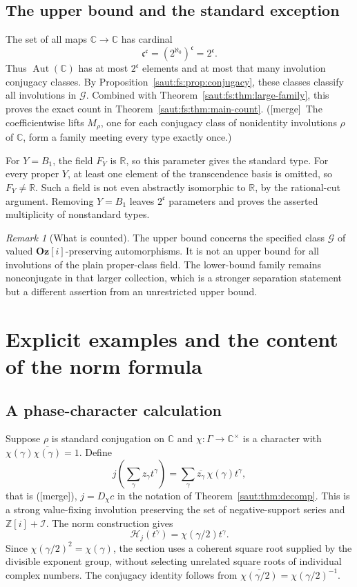 \documentclass[11pt]{article}
\theoremstyle{definition}
\theoremstyle{remark}
\newtheorem{remark}[theorem]{Remark}
\newcommand{\R}{\mathbb R}
\newcommand{\C}{\mathbb C}
\newcommand{\Z}{\mathbb Z}
\newcommand{\Aut}{\operatorname{Aut}}
\newcommand{\Oz}{\mathbf{Oz}}
\newcommand{\cc}{\mathfrak c}
\newcommand{\Ineg}{\mathcal I}
\newcommand{\mergetag}{\textup{[merge]}}
\numberwithin{equation}{section}
\begin{document}
\subsection{The upper bound and the standard exception}

The set of all maps $\C\to\C$ has cardinal
\[
 \cc^{\cc}=(2^{\aleph_0})^{\cc}=2^{\cc}.
\]
Thus $\Aut(\C)$ has at most $2^{\cc}$ elements and at most that many involution
conjugacy classes. By Proposition~\ref{saut:fs:prop:conjugacy}, these classes classify
all involutions in $\mathcal G$. Combined with Theorem~\ref{saut:fs:thm:large-family},
this proves the exact count in Theorem~\ref{saut:fs:thm:main-count}. (\mergetag\ The
coefficientwise lifts $M_\rho$, one for each conjugacy class of nonidentity
involutions $\rho$ of $\C$, form a family meeting every type exactly once.)

For $Y=B_1$, the field $F_Y$ is $\R$, so this parameter gives the standard type. For
every proper $Y$, at least one element of the transcendence basis is omitted, so
$F_Y\ne\R$. Such a field is not even abstractly isomorphic to $\R$, by the
rational-cut argument. Removing $Y=B_1$ leaves $2^{\cc}$ parameters and proves the
asserted multiplicity of nonstandard types.

\begin{remark}[What is counted]\label{saut:fs:rem:counted}
The upper bound concerns the specified class $\mathcal G$ of valued
$\Oz[i]$-preserving automorphisms. It is not an upper bound for all involutions of the
plain proper-class field. The lower-bound family remains nonconjugate in that larger
collection, which is a stronger separation statement but a different assertion from
an unrestricted upper bound.
\end{remark}

\section{Explicit examples and the content of the norm formula}\label{saut:fs:sec:examples}

\subsection{A phase-character calculation}

Suppose $\rho$ is standard conjugation on $\C$ and $\chi:\Gamma\to\C^\times$ is a
character with $\chi(\gamma)\overline{\chi(\gamma)}=1$. Define
\[
 j\left(\sum_\gamma z_\gamma t^\gamma\right)
 =\sum_\gamma\overline{z_\gamma}\,\chi(\gamma)t^\gamma,
\]
that is (\mergetag), $j=D_\chi c$ in the notation of Theorem~\ref{saut:thm:decomp}. This is a
strong value-fixing involution preserving the set of negative-support series and
$\Z[i]+\Ineg$. The norm construction gives
\[
 \mathcal H_j(t^\gamma)=\chi(\gamma/2)t^\gamma .
\]
Since $\chi(\gamma/2)^2=\chi(\gamma)$, the section uses a coherent square root
supplied by the divisible exponent group, without selecting unrelated square roots of
individual complex numbers. The conjugacy identity follows from
$\overline{\chi(\gamma/2)}=\chi(\gamma/2)^{-1}$.
\end{document}

